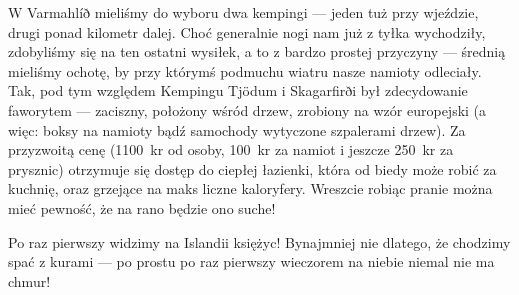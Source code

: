 W Varmahlíð mieliśmy do wyboru dwa kempingi --- jeden tuż przy wjeździe, drugi ponad kilometr dalej. Choć generalnie nogi nam już z tyłka wychodziły, zdobyliśmy się na ten ostatni wysiłek, a to z bardzo prostej przyczyny --- średnią mieliśmy ochotę, by przy którymś podmuchu wiatru nasze namioty odleciały. Tak, pod tym względem Kempingu Tjödum i Skagarfirði był zdecydowanie faworytem --- zaciszny, położony wśród drzew, zrobiony na wzór europejski (a więc: boksy na namioty bądź samochody wytyczone szpalerami drzew). Za przyzwoitą cenę (1100~kr od osoby, 100~kr za namiot i jeszcze 250~kr za prysznic) otrzymuje się dostęp do ciepłej łazienki, która od biedy może robić za kuchnię, oraz grzejące na maks liczne kaloryfery. Wreszcie robiąc pranie można mieć pewność, że na rano będzie ono suche!

Po raz pierwszy widzimy na Islandii księżyc! Bynajmniej nie dlatego, że chodzimy spać z kurami --- po prostu po raz pierwszy wieczorem na niebie niemal nie ma chmur!
